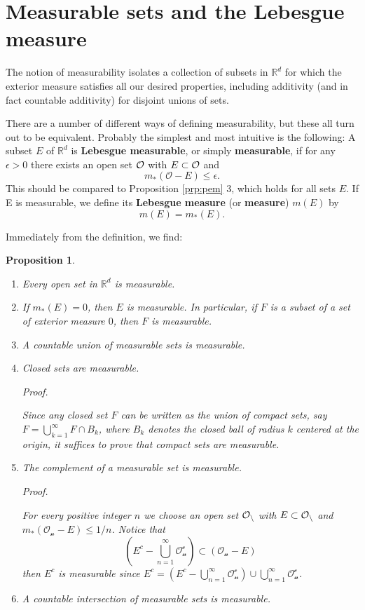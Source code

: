 \documentclass[
]{book}
\providecommand{\tightlist}{%
  \setlength{\itemsep}{0pt}\setlength{\parskip}{0pt}}
\newtheorem{proposition}{Proposition}[chapter]
\theoremstyle{definition}
\theoremstyle{definition}
\theoremstyle{definition}
\theoremstyle{definition}
\theoremstyle{remark}
\begin{document}
\section{Measurable sets and the Lebesgue measure}\label{measurable-sets-and-the-lebesgue-measure}

The notion of measurability isolates a collection of subsets in \(\mathbb{R}^d\) for which the exterior measure satisfies all our desired properties, including additivity (and in fact countable additivity) for disjoint unions of sets.

There are a number of different ways of defining measurability, but these all turn out to be equivalent. Probably the simplest and most intuitive is the following: A subset \(E\) of \(\mathbb{R}^d\) is \textbf{Lebesgue measurable}, or simply \textbf{measurable}, if for any \(\epsilon > 0\) there exists an open set \(\cal O\) with \(E\subset\cal O\) and
\[
m_{\ast}(\mathcal{O}-E) ≤ \epsilon.
\]
This should be compared to Proposition \ref{prp:pem} 3, which holds for all sets \(E\). If E is measurable, we define its \textbf{Lebesgue measure} (or \textbf{measure}) \(m(E)\) by
\[
m(E)=m_{\ast}(E).
\]

Immediately from the definition, we find:

\begin{proposition}
\leavevmode

\begin{enumerate}
\def\labelenumi{\arabic{enumi}.}
\tightlist
\item
  Every open set in \(\mathbb{R}^d\) is measurable.
\item
  If \(m_{\ast}(E)=0\), then \(E\) is measurable. In particular, if \(F\) is a subset of a set of exterior measure \(0\), then \(F\) is measurable.
\item
  A countable union of measurable sets is measurable.
\item
  Closed sets are measurable.

  \emph{Proof.}

  Since any closed set \(F\) can be written as the union of compact sets, say \(F=\bigcup_{k=1}^{\infty}F\cap B_k\), where \(B_k\) denotes the closed ball of radius \(k\) centered at the origin, it suffices to prove that compact sets are measurable.
\item
  The complement of a measurable set is measurable.

  \emph{Proof.}

  For every positive integer \(n\) we choose an open set \(\cal O_n\) with \(E\subset \cal O_n\) and \(m_{\ast}(\mathcal{O_n}-E)\leq 1/n\). Notice that
  \[
    (E^c-\bigcup_{n=1}^{\infty}\mathcal{O_n^c}) \subset(\mathcal{O_n}-E)
    \]
  then \(E^c\) is measurable since \(E^c=(E^c-\bigcup_{n=1}^{\infty}\mathcal{O_n^c})\cup \bigcup_{n=1}^{\infty}\mathcal{O_n^c}\).
\item
  A countable intersection of measurable sets is measurable.
\end{enumerate}

\end{proposition}
\end{document}
